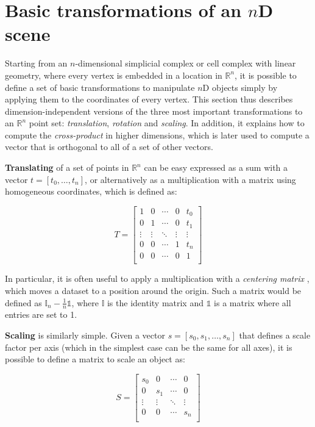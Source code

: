 \section{Basic transformations of an $n$D scene}
\label{se:ndmath}

Starting from an $n$-dimensional simplicial complex or cell complex with linear geometry, where every vertex is embedded in a location in $\mathbb{R}^n$, it is possible to define a set of basic transformations to manipulate $n$D objects simply by applying them to the coordinates of every vertex.
This section thus describes dimension-independent versions of the three most important transformations to an $\mathbb{R}^n$ point set: \emph{translation}, \emph{rotation} and \emph{scaling}.
In addition, it explains how to compute the \emph{cross-product} in higher dimensions, which is later used to compute a vector that is orthogonal to all of a set of other vectors.

\textbf{Translating} of a set of points in $\mathbb{R}^n$ can be easy expressed as a sum with a vector $t = \left[t_0, \ldots, t_n\right]$, or alternatively as a multiplication with a matrix using homogeneous coordinates, which is defined as:

\begin{equation*}
T = \begin{bmatrix}
1 & 0 & \cdots & 0 & t_0 \\
0 & 1 & \cdots & 0 & t_1 \\
\vdots & \vdots & \ddots & \vdots & \vdots \\
0 & 0 & \cdots & 1 & t_n \\
0 & 0 & \cdots & 0 & 1 \\
\end{bmatrix}
\end{equation*}

In particular, it is often useful to apply a multiplication with a \emph{centering matrix} \citep[\S{}3.2]{Marden96}, which  moves a dataset to a position around the origin.
Such a matrix would be defined as $\mathbb{I}_n - \frac{1}{n}\mathbb{1}$, where $\mathbb{I}$ is the identity matrix and $\mathbb{1}$ is a matrix where all entries are set to 1.

\textbf{Scaling} is similarly simple.
Given a vector $s = \left[ s_0, s_1, \ldots, s_n \right]$ that defines a scale factor per axis (which in the simplest case can be the same for all axes), it is possible to define a matrix to scale an object as:

\begin{equation*}
S = \begin{bmatrix}
s_0 & 0 & \cdots & 0 \\
0 & s_1 & \cdots & 0 \\
\vdots & \vdots & \ddots & \vdots \\
0 & 0 & \cdots & s_n \\
\end{bmatrix}
\end{equation*}

